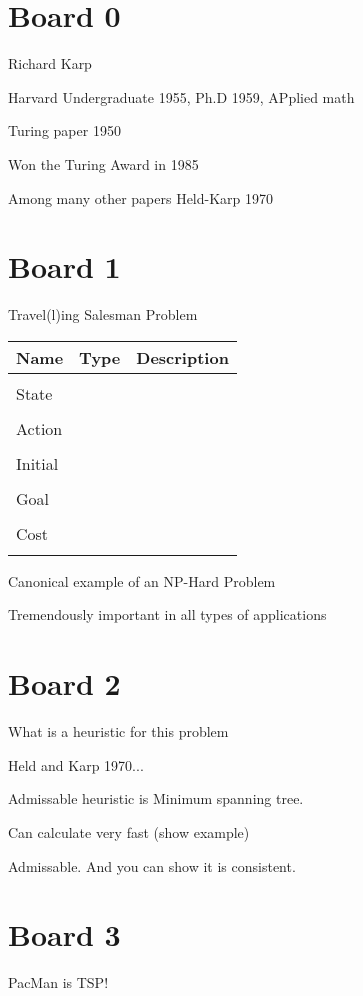 \documentclass[10pt]{article}
\begin{document}
\MakeScribeTop{}

\section{Board 0}

Richard Karp

Harvard Undergraduate 1955, Ph.D 1959, APplied math

Turing paper 1950

Won the Turing Award in 1985

Among many other papers Held-Karp 1970

\section{Board 1}

Travel(l)ing Salesman Problem

\begin{center}
\begin{tabularx}{\linewidth}{llX}
  \toprule
  Name  & Type & Description \\
  \midrule
\\
 State &  & \censor{}  \\\\
 Action &   & \censor{} \\\\
 Initial & & \censor{} \\\\
 Goal & & \censor{} \\\\
 Cost & & \\\\
 \bottomrule
\end{tabularx}
\end{center}

Canonical example of an NP-Hard Problem

Tremendously important in all types of applications

\section{Board 2}

What is a heuristic for this problem 

Held and Karp 1970...

Admissable heuristic is Minimum spanning tree. 

Can calculate very fast (show example)

Admissable. And you can show it is consistent.

\section{Board 3}

PacMan is TSP! 



\end{document}
